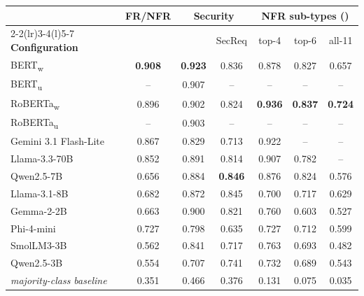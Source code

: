 \setlength{\tabcolsep}{7pt}
\renewcommand{\arraystretch}{1.05}
\begin{tabular}{@{}lcccccc@{}}
\toprule
& \textbf{FR/NFR} & \multicolumn{2}{c}{\textbf{Security}} & \multicolumn{3}{c}{\textbf{NFR sub-types (\pex{})}} \\
\cmidrule(lr){2-2}\cmidrule(lr){3-4}\cmidrule(l){5-7}
\textbf{Configuration} & \pex{} & \pex{} & SecReq & top-4 & top-6 & all-11 \\
\midrule
BERT\textsubscript{w} & \textbf{0.908} & \textbf{0.923} & 0.836 & 0.878 & 0.827 & 0.657 \\
BERT\textsubscript{u} & -- & 0.907 & -- & -- & -- & -- \\
RoBERTa\textsubscript{w} & 0.896 & 0.902 & 0.824 & \textbf{0.936} & \textbf{0.837} & \textbf{0.724} \\
RoBERTa\textsubscript{u} & -- & 0.903 & -- & -- & -- & -- \\
\addlinespace[1.5pt]
Gemini 3.1 Flash-Lite & 0.867 & 0.829 & 0.713 & 0.922 & -- & -- \\
Llama-3.3-70B & 0.852 & 0.891 & 0.814 & 0.907 & 0.782 & -- \\
\addlinespace[1.5pt]
Qwen2.5-7B & 0.656 & 0.884 & \textbf{0.846} & 0.876 & 0.824 & 0.576 \\
Llama-3.1-8B & 0.682 & 0.872 & 0.845 & 0.700 & 0.717 & 0.629 \\
Gemma-2-2B & 0.663 & 0.900 & 0.821 & 0.760 & 0.603 & 0.527 \\
Phi-4-mini & 0.727 & 0.798 & 0.635 & 0.727 & 0.712 & 0.599 \\
SmolLM3-3B & 0.562 & 0.841 & 0.717 & 0.763 & 0.693 & 0.482 \\
Qwen2.5-3B & 0.554 & 0.707 & 0.741 & 0.732 & 0.689 & 0.543 \\
\midrule
\textit{majority-class baseline} & 0.351 & 0.466 & 0.376 & 0.131 & 0.075 & 0.035 \\
\bottomrule
\end{tabular}
